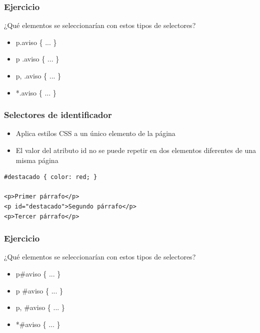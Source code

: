 \documentclass[ucs]{beamer}
\begin{document}

\begin{frame}
\frametitle{Ejercicio}

¿Qué elementos se seleccionarían con estos tipos de selectores?

\begin{itemize}
  \item p.aviso \{ ... \}
  \item p .aviso \{ ... \}
  \item p, .aviso \{ ... \}
  \item *.aviso \{ ... \}
\end{itemize}

\end{frame}


\begin{frame}[fragile]
\frametitle{Selectores de identificador}

\begin{itemize}
  \item Aplica estilos CSS a un único elemento de la página
  \item El valor del atributo id no se puede repetir en dos elementos diferentes de una misma página
\end{itemize}

\begin{verbatim}
#destacado { color: red; }
 
<p>Primer párrafo</p>
<p id="destacado">Segundo párrafo</p>
<p>Tercer párrafo</p>
\end{verbatim}

\end{frame}



\begin{frame}
\frametitle{Ejercicio}

¿Qué elementos se seleccionarían con estos tipos de selectores?

\begin{itemize}
  \item p\#aviso \{ ... \}
  \item p \#aviso \{ ... \}
  \item p, \#aviso \{ ... \}
  \item *\#aviso \{ ... \}
\end{itemize}


\end{frame}
\end{document}
